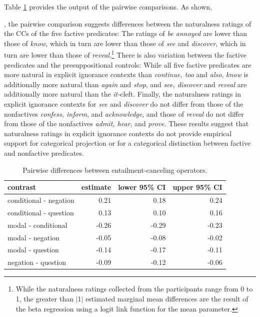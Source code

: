 \documentclass[a4paper,12pt,twoside]{article}
\begin{document}
Table \ref{t:pairwise} provides the output of the pairwise comparisons. As shown, 

, the pairwise comparison suggests differences between the naturalness ratings of the CCs of the five factive predicates: The ratings of {\em be annoyed} are lower than those of {\em know}, which in turn are lower than those of {\em see} and {\em discover}, which in turn are lower than those of {\em reveal}.\footnote{While the naturalness ratings collected from the participants range from 0 to 1, the greater than $|$1$|$  estimated marginal mean differences are the result of the beta regression using a logit link function for the mean parameter.} There is also variation between the factive predicates and the presuppositional controls: While all five factive predicates are more natural in explicit ignorance contexts than {\em continue, too} and {\em also}, {\em know} is additionally more natural than {\em again} and {\em stop}, and {\em see, discover} and {\em reveal} are additionally more natural than the {\em it-}cleft. Finally, the naturalness ratings in explicit ignorance contexts for {\em see} and {\em discover} do not differ from those of the nonfactives {\em confess, inform}, and {\em acknowledge}, and those of {\em reveal} do not differ from those of the nonfactives {\em admit, hear}, and {\em prove}. These results suggest that naturalness ratings in explicit ignorance contexts do not provide empirical support for categorical projection or for a categorical distinction between factive and nonfactive predicates. 

\begin{table}[!h]
\centering
\begin{tabular}{lrrr}
 contrast & estimate & lower 95\% CI & upper 95\% CI \\\hline 
 conditional - negation & 0.21 & 0.18 & 0.24 \\ 
  conditional - question & 0.13 & 0.10 & 0.16 \\ 
  modal - conditional & -0.26 & -0.29 & -0.23 \\ 
  modal - negation & -0.05 & -0.08 & -0.02 \\ 
  modal - question & -0.14 & -0.17 & -0.11 \\ 
  negation - question & -0.09 & -0.12 & -0.06 \\ 
\end{tabular}
\caption{Pairwise differences between entailment-canceling operators.}\label{t:pairwise}
\end{table}
\end{document}
